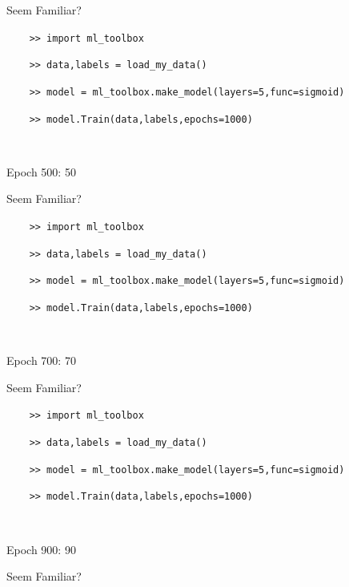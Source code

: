 \documentclass[]{SangerLibrary/sanger-present}
\begin{document}
{\begin{frame}[fragile]{\color{computer}Seem Familiar?}
			{\color{computer}
			\verb|    >> import ml_toolbox|\par\par
			\verb|    >> data,labels = load_my_data()|\par\par
			\verb|    >> model = ml_toolbox.make_model(layers=5,func=sigmoid)|\par\par
			\verb|    >> model.Train(data,labels,epochs=1000)|\par~\par
			\verb@    Epoch 500: 50%|xxxxxxxxx       | [500/1000 12it/s, loss = 1.4]@\par~\par~
			}
		\end{frame}
		\begin{frame}[fragile]{\color{computer}Seem Familiar?}
			
			{\color{computer}
			\verb|    >> import ml_toolbox|\par\par
			\verb|    >> data,labels = load_my_data()|\par\par
			\verb|    >> model = ml_toolbox.make_model(layers=5,func=sigmoid)|\par\par
			\verb|    >> model.Train(data,labels,epochs=1000)|\par~\par
			\verb@    Epoch 700: 70%|xxxxxxxxxxxx    | [700/1000 5it/s, loss = 1.39]@\par~\par~
			}
		\end{frame}
		\begin{frame}[fragile]{\color{computer}Seem Familiar?}
			
			{\color{computer}
			\verb|    >> import ml_toolbox|\par\par
			\verb|    >> data,labels = load_my_data()|\par\par
			\verb|    >> model = ml_toolbox.make_model(layers=5,func=sigmoid)|\par\par
			\verb|    >> model.Train(data,labels,epochs=1000)|\par~\par
			\verb@    Epoch 900: 90%|xxxxxxxxxxxxxxx | [900/1000 8it/s, loss = 1.385]@\par~\par~
			}
		\end{frame}
		\begin{frame}[fragile]{\color{computer}Seem Familiar?}
			

\end{frame}}
\end{document}
